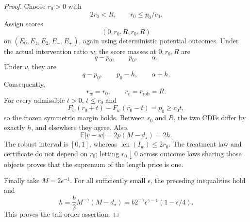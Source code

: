 \documentclass{article}
\begin{document}
\begin{proof}
Choose \(r_0>0\) with
\[
2r_0<R,\qquad r_0\le p_0/c_0.
\]
Assign scores
\[
(0,r_0,R,r_0,R)
\]
on \((E_0,E_1,E_2,E_-,E_+)\), again using deterministic potential outcomes. Under the actual intervention ratio \(w\), the score masses at \(0,r_0,R\) are
\[
q-p_0,\qquad p_0,\qquad\alpha.
\]
Under \(v\), they are
\[
q-p_0,\qquad p_0-h,\qquad\alpha+h.
\]
Consequently,
\[
r_w=r_0,\qquad r_v=r_{\mathrm{rob}}=R.
\]
For every admissible \(t>0\), \(t\le r_0\) and
\[
F_w(r_0+t)-F_w(r_0-t)=p_0\ge c_0t,
\]
so the frozen symmetric margin holds. Between \(r_0\) and \(R\), the two CDFs differ by exactly \(h\), and elsewhere they agree. Also,
\[
\mathbb E|v-w|=2p(M-d_\star)=2h.
\]
The robust interval is \([0,1]\), whereas \(\operatorname{len}(I_w)\le2r_0\). The treatment law and certificate do not depend on \(r_0\); letting \(r_0\downarrow0\) across outcome laws sharing those objects proves that the supremum of the length price is one.

Finally take \(M=2\epsilon^{-1}\). For all sufficiently small \(\epsilon\), the preceding inequalities hold and
\[
h=\frac b2M^{-\gamma}(M-d_\star)
 =b2^{-\gamma}\epsilon^{\gamma-1}(1-\epsilon/4).
\]
This proves the tail-order assertion.
\end{proof}
\end{document}
